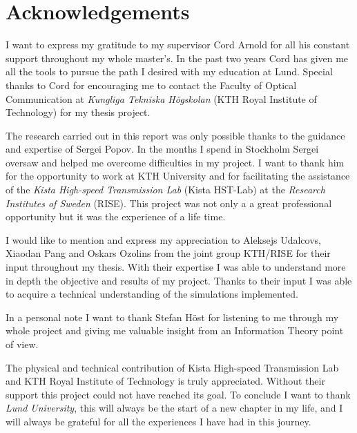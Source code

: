\chapter*{Acknowledgements}

I want to express my gratitude to my supervisor Cord Arnold for all his constant support throughout my whole master's. In the past two years Cord has given me all the tools to pursue the path I desired with my education at Lund. Special thanks to Cord for encouraging  me to contact the Faculty of Optical Communication at \textit{Kungliga Tekniska Högskolan} (KTH Royal Institute of Technology) for my thesis project.	  

The research carried out in this report was only possible thanks to the guidance and expertise of Sergei Popov. In the months I spend in Stockholm Sergei oversaw and helped me overcome difficulties in my project. I want to thank him for the opportunity to work at KTH University and for facilitating the assistance of the \textit{ Kista High-speed Transmission Lab} (Kista HST-Lab) at the \textit{Research Institutes of Sweden} (RISE).	 This project was not only a a great professional opportunity but it was the experience of a life time.

I would like to mention and express my appreciation to Aleksejs Udalcovs, Xiaodan Pang and Oskars Ozolins from the joint group KTH/RISE for their input throughout my thesis. With their expertise I was able to understand more in depth the objective and results of my project. Thanks to their input I was able to acquire a technical understanding of the simulations implemented.

In a personal note I want to thank Stefan Höst for listening to me through my whole project and giving me valuable insight from an Information Theory point of view.   

The physical and technical contribution of Kista High-speed Transmission Lab and KTH Royal Institute of Technology  is truly appreciated. Without their support  this project could not have reached its goal. To conclude I want to thank \textit{Lund University}, this will always be the start of a new chapter in my life, and I will always be grateful for all the experiences I have had in this journey. ~\\


